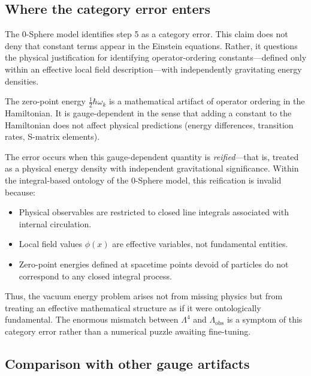 \documentclass[12pt,letterpaper]{article}
\begin{document}
\subsection{Where the category error enters}

The 0-Sphere model identifies step 5 as a category error. This claim does not deny that constant terms appear in the Einstein equations. Rather, it questions the physical justification for identifying operator-ordering constants---defined only within an effective local field description---with independently gravitating energy densities.

The zero-point energy $\frac{1}{2}\hbar\omega_k$ is a mathematical artifact of operator ordering in the Hamiltonian. It is gauge-dependent in the sense that adding a constant to the Hamiltonian does not affect physical predictions (energy differences, transition rates, S-matrix elements).

The error occurs when this gauge-dependent quantity is \emph{reified}---that is, treated as a physical energy density with independent gravitational significance. Within the integral-based ontology of the 0-Sphere model, this reification is invalid because:

\begin{itemize}
\item Physical observables are restricted to closed line integrals associated with internal circulation.
\item Local field values $\phi(x)$ are effective variables, not fundamental entities.
\item Zero-point energies defined at spacetime points devoid of particles do not correspond to any closed integral process.
\end{itemize}

Thus, the vacuum energy problem arises not from missing physics but from treating an effective mathematical structure as if it were ontologically fundamental. The enormous mismatch between $\Lambda^4$ and $\Lambda_{\mathrm{obs}}$ is a symptom of this category error rather than a numerical puzzle awaiting fine-tuning.

\subsection{Comparison with other gauge artifacts}
\end{document}
